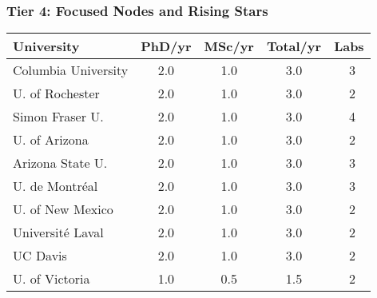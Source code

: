 \documentclass[aspectratio=169]{beamer}
\newcommand{\tabletext}{\normalsize}
\begin{document}
\begin{frame}
    \frametitle{Tier 4: Focused Nodes and Rising Stars}
    \subtitle{Producers with 1-3 total theses per year, often with deep specialization.}
    
    \begin{table}
        \centering
        \tabletext
        \begin{tabularx}{\textwidth}{
            l
            S[table-format=1.1]
            S[table-format=1.1]
            S[table-format=1.1]
            S[table-format=2.0, table-space-text-pre=~]
        }
            \toprule
            \textbf{University} & {\textbf{PhD/yr}} & {\textbf{MSc/yr}} & {\textbf{Total/yr}} & {\textbf{Labs}} \\
            \midrule
            Columbia University & 2.0 & 1.0 & 3.0 & ~3 \\
            U. of Rochester & 2.0 & 1.0 & 3.0 & ~2 \\
            Simon Fraser U. & 2.0 & 1.0 & 3.0 & ~4 \\
            U. of Arizona & 2.0 & 1.0 & 3.0 & ~2 \\
            Arizona State U. & 2.0 & 1.0 & 3.0 & ~3 \\ %
            U. de Montréal & 2.0 & 1.0 & 3.0 & ~3 \\
            U. of New Mexico & 2.0 & 1.0 & 3.0 & ~2 \\
            Université Laval & 2.0 & 1.0 & 3.0 & ~2 \\
            UC Davis & 2.0 & 1.0 & 3.0 & ~2 \\
            U. of Victoria & 1.0 & 0.5 & 1.5 & ~2 \\
            \bottomrule
        \end{tabularx}
    \end{table}
\end{frame}
\end{document}
